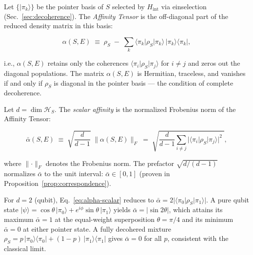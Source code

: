 \begin{definition}
\label{def:alpha-tensor}
Let $\{\vert \pi_k \rangle\}$ be the pointer basis of $S$
selected by $H_{\mathrm{int}}$ via einselection
(Sec.~\ref{sec:decoherence}).
The \emph{Affinity Tensor} is the off-diagonal part of the
reduced density matrix in this basis:

\begin{equation}
\label{eq:alpha-tensor}
\alpha(S,E) \;\equiv\; \rho_S \;-\; \sum_k
  \langle \pi_k \vert \rho_S \vert \pi_k \rangle\,
  \vert \pi_k \rangle\langle \pi_k \vert,
\end{equation}

\noindent
i.e., $\alpha(S,E)$ retains only the coherences
$\langle \pi_i \vert \rho_S \vert \pi_j \rangle$ for $i \neq j$
and zeros out the diagonal populations.
The matrix $\alpha(S,E)$ is Hermitian, traceless, and vanishes
if and only if $\rho_S$ is diagonal in the pointer basis --- the
condition of complete decoherence.
\end{definition}

\begin{definition}
\label{def:alpha-scalar}
Let $d = \dim \mathcal{H}_S$.
The \emph{scalar affinity} is the normalized Frobenius norm of
the Affinity Tensor:

\begin{equation}
\label{eq:alpha-scalar}
\bar{\alpha}(S,E)
  \;\equiv\;
  \sqrt{\frac{d}{d-1}}\;
  \bigl\lVert \alpha(S,E) \bigr\rVert_F
  \;=\;
  \sqrt{\frac{d}{d-1}\sum_{i \neq j}
    \bigl\lvert
      \langle \pi_i \vert \rho_S \vert \pi_j \rangle
    \bigr\rvert^2\;},
\end{equation}

\noindent
where $\lVert \cdot \rVert_F$ denotes the Frobenius norm.
The prefactor $\sqrt{d/(d-1)}$ normalizes $\bar{\alpha}$ to the
unit interval: $\bar{\alpha} \in [0, 1]$ (proven in
Proposition~\ref{prop:correspondence}).
\end{definition}

\begin{remark}
\label{rem:boundary}
For $d = 2$ (qubit), Eq.~\eqref{eq:alpha-scalar} reduces to
$\bar{\alpha} = 2\lvert \langle \pi_0 \vert \rho_S \vert \pi_1 \rangle \rvert$.
A pure qubit state $\vert \psi \rangle = \cos\theta\,\vert\pi_0\rangle
+ e^{i\phi}\sin\theta\,\vert\pi_1\rangle$ yields
$\bar{\alpha} = \lvert \sin 2\theta \rvert$, which attains its
maximum $\bar{\alpha} = 1$ at the equal-weight superposition
$\theta = \pi/4$ and its minimum $\bar{\alpha} = 0$ at either
pointer state.
A fully decohered mixture $\rho_S = p\,\vert\pi_0\rangle\langle\pi_0\vert
+ (1-p)\,\vert\pi_1\rangle\langle\pi_1\vert$ gives $\bar{\alpha} = 0$
for all $p$, consistent with the classical limit.
\end{remark}

